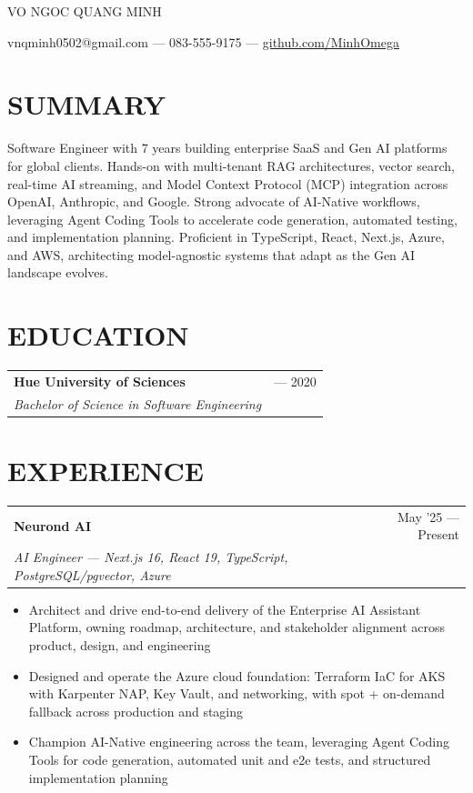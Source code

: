 \documentclass[letterpaper,10pt]{article}
\makeatletter
\newcommand{\resumeSubheading}[4]{
  \begin{tabularx}{\textwidth}{@{}X r@{}}
    \fontsize{11}{13}\selectfont\textbf{#1} & \fontsize{11}{13}\selectfont #2 \\
    \textit{#3} & \textit{#4} \\
  \end{tabularx}
  \vspace{-2pt}
}
\makeatother
\begin{document}
\begin{center}
  \fontsize{20.7}{25}\selectfont VO NGOC QUANG MINH
\end{center}

\begin{center}
  vnqminh0502@gmail.com --- 083-555-9175 --- \href{https://github.com/MinhOmega}{github.com/MinhOmega}
\end{center}

\section{SUMMARY}
Software Engineer with 7 years building enterprise SaaS and Gen AI platforms for global clients. Hands-on with multi-tenant RAG architectures, vector search, real-time AI streaming, and Model Context Protocol (MCP) integration across OpenAI, Anthropic, and Google. Strong advocate of AI-Native workflows, leveraging Agent Coding Tools to accelerate code generation, automated testing, and implementation planning. Proficient in TypeScript, React, Next.js, Azure, and AWS, architecting model-agnostic systems that adapt as the Gen AI landscape evolves.

\section{EDUCATION}
\resumeSubheading{Hue University of Sciences}{2016 --- 2020}
{Bachelor of Science in Software Engineering}{}

\section{EXPERIENCE}

\resumeSubheading{Neurond AI}{May '25 --- Present}
{AI Engineer --- Next.js 16, React 19, TypeScript, PostgreSQL/pgvector, Azure}{}
\begin{itemize}
  \item Architect and drive end-to-end delivery of the Enterprise AI Assistant Platform, owning roadmap, architecture, and stakeholder alignment across product, design, and engineering
  \item Designed and operate the Azure cloud foundation: Terraform IaC for AKS with Karpenter NAP, Key Vault, and networking, with spot + on-demand fallback across production and staging
  \item Champion AI-Native engineering across the team, leveraging Agent Coding Tools for code generation, automated unit and e2e tests, and structured implementation planning
\end{itemize}
\end{document}
